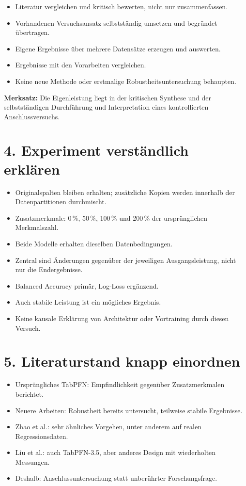 \documentclass[11pt,a4paper]{article}
\begin{document}
\begin{itemize}
  \item Literatur vergleichen und kritisch bewerten, nicht nur zusammenfassen.
  \item Vorhandenen Versuchsansatz selbstständig umsetzen und begründet übertragen.
  \item Eigene Ergebnisse über mehrere Datensätze erzeugen und auswerten.
  \item Ergebnisse mit den Vorarbeiten vergleichen.
  \item Keine neue Methode oder erstmalige Robustheitsuntersuchung behaupten.
\end{itemize}

\textbf{Merksatz:} Die Eigenleistung liegt in der kritischen Synthese
und der selbstständigen Durchführung und Interpretation eines
kontrollierten Anschlussversuchs.

\section*{4. Experiment verständlich erklären}

\begin{itemize}
  \item Originalspalten bleiben erhalten; zusätzliche Kopien werden
        innerhalb der Datenpartitionen durchmischt.
  \item Zusatzmerkmale: 0\,\%, 50\,\%, 100\,\% und 200\,\% der
        ursprünglichen Merkmalszahl.
  \item Beide Modelle erhalten dieselben Datenbedingungen.
  \item Zentral sind Änderungen gegenüber der jeweiligen Ausgangsleistung,
        nicht nur die Endergebnisse.
  \item Balanced Accuracy primär, Log-Loss ergänzend.
  \item Auch stabile Leistung ist ein mögliches Ergebnis.
  \item Keine kausale Erklärung von Architektur oder Vortraining
        durch diesen Versuch.
\end{itemize}

\section*{5. Literaturstand knapp einordnen}

\begin{itemize}
  \item Ursprüngliches TabPFN: Empfindlichkeit gegenüber Zusatzmerkmalen berichtet.
  \item Neuere Arbeiten: Robustheit bereits untersucht, teilweise stabile Ergebnisse.
  \item Zhao et al.: sehr ähnliches Vorgehen, unter anderem auf realen Regressionsdaten.
  \item Liu et al.: auch TabPFN-3.5, aber anderes Design mit wiederholten Messungen.
  \item Deshalb: Anschlussuntersuchung statt unberührter Forschungsfrage.
\end{itemize}
\end{document}
